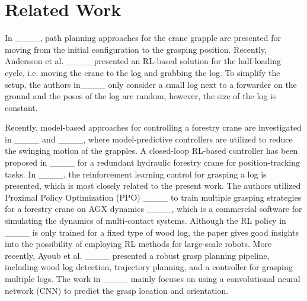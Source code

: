 \section{Related Work}
\label{Sec:rw}

In ____, path planning approaches for the crane grapple are presented for moving from the initial configuration to the grasping position.  
Recently, Andersson et al. ____ presented an RL-based solution for the half-loading cycle, i.e. moving the crane to the log and grabbing the log. To simplify the setup, the authors in____ only consider a small log next to a forwarder on the ground and the poses of the log are random, however, the size of the log is constant. 

Recently, model-based approaches for controlling a forestry crane are investigated in  ____ and ____, where model-predictive controllers are utilized to reduce the swinging motion of the grapples. A closed-loop RL-based controller has been proposed in ____ for a redundant hydraulic forestry crane for position-tracking tasks. In ____, the reinforcement learning control for grasping a log is presented, which is most closely related to the present work. The authors utilized Proximal Policy Optimization (PPO) ____ to train multiple grasping strategies for a forestry crane on AGX dynamics ____, which is a commercial software for simulating the dynamics of multi-contact systems. 
Although the RL policy in ____ is only trained for a fixed type of wood log, the paper gives good insights into the possibility of employing RL methods for large-scale robots. More recently, Ayoub et al. ____ presented a robust grasp planning pipeline, including wood log detection, trajectory planning, and a controller for grasping multiple logs. The work in ____ mainly focuses on using a convolutional neural network (CNN) to predict the grasp location and orientation.